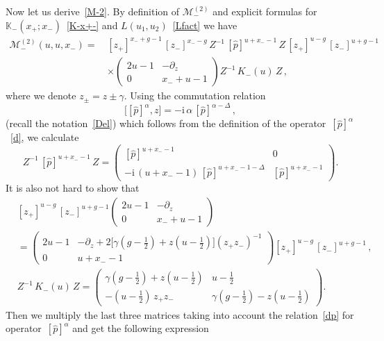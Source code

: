 \documentclass[a4paper,11pt]{article}
\renewcommand{\imath}{\mathrm{i}}
\numberwithin{equation}{section}
\begin{document}
Now let us derive~\eqref{M-2}.
By definition of $\mathcal{M}^{(2)}_-$ and explicit formulas for $\mathbb{K}_-(x_+;x_-)$~\eqref{K-x+-} and $L(u_1,u_2)$~\eqref{Lfact} we have
\begin{align}
	\nonumber
	\mathcal{M}^{(2)}_-(u,u,x_-) = \, &
	[z_+]^{x_-+g-1}\,[z_-]^{x_--g}\,Z^{-1}\,[\hat{p}]^{u+x_--1}\,Z\,[z_+]^{u-g}\,[z_-]^{u+g-1} \\
	\nonumber %
	& \times
	\begin{pmatrix}
		2u-1 & -\partial_z \\
		0 & x_-+u-1
	\end{pmatrix}
	Z^{-1}\,K_-(u)\,Z \,,
\end{align}
where we denote $z_\pm = z\pm \gamma$.
Using the commutation relation
\begin{equation} \nonumber
	\bigl[[\hat{p}]^\alpha,z\bigr] = -\imath\,\alpha\,[\hat{p}]^{\alpha-\Delta} \,,
\end{equation}
(recall the notation~\eqref{Del}) which follows from the definition of the operator~$[\hat{p}]^\alpha$~\eqref{d}, we calculate
\begin{equation} \nonumber
	Z^{-1}\,[\hat{p}]^{u+x_--1}\,Z =
	\begin{pmatrix}
		[\hat{p}]^{u+x_--1} & 0 \\
		-\imath\,(u+x_--1)\,[\hat{p}]^{u+x_--1-\Delta} & [\hat{p}]^{u+x_--1}
	\end{pmatrix}.
\end{equation}
It is also not hard to show that
\begin{align}
	& \nonumber
	[z_+]^{u-g}\,[z_-]^{u+g-1}
	\begin{pmatrix}
		2u-1 & -\partial_z \\
		0 & x_-+u-1
	\end{pmatrix} \\
	& \nonumber
	=
	\begin{pmatrix}
		2u-1 & -\partial_z+2\bigl[\gamma(g-\frac{1}{2})+z(u-\frac{1}{2})\bigr](z_+z_-)^{-1} \\
		0 & u+x_--1
	\end{pmatrix}
	[z_+]^{u-g}\,[z_-]^{u+g-1} \,, \\
	& \nonumber
	Z^{-1}\,K_-(u)\,Z =
	\begin{pmatrix}
		\gamma(g-\frac{1}{2})+z(u-\frac{1}{2}) & u-\frac{1}{2} \\
		-(u-\frac{1}{2})\,z_+z_- & \gamma(g-\frac{1}{2})-z(u-\frac{1}{2})
	\end{pmatrix}.
\end{align}
Then we multiply the last three matrices taking into account the relation~\eqref{dp} for operator~$[\hat{p}]^\alpha$ and get the following expression
\end{document}
